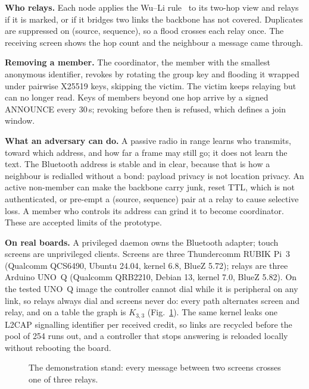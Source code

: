 \documentclass[10pt,twocolumn,letterpaper]{article}
\newcommand{\sub}[1]{\smallskip\noindent\textsf{\textbf{#1}}\enspace}
\begin{document}
\sub{Who relays.} Each node applies the Wu--Li rule~\cite{wuli1999} to
its two-hop view and relays if it is marked, or if it bridges two links
the backbone has not covered. Duplicates are suppressed on (source,
sequence), so a flood crosses each relay once. The receiving screen
shows the hop count and the neighbour a message came through.

\sub{Removing a member.} The coordinator, the member with the smallest
anonymous identifier, revokes by rotating the group key and flooding it
wrapped under pairwise X25519 keys, skipping the victim. The victim keeps
relaying but can no longer read. Keys of members beyond one hop arrive
by a signed ANNOUNCE every 30\,s; revoking before then is refused, which
defines a join window.

\sub{What an adversary can do.} A passive radio in range learns who
transmits, toward which address, and how far a frame may still go; it
does not learn the text. The Bluetooth address is stable and in clear,
because that is how a neighbour is redialled without a bond: payload
privacy is not location privacy. An active non-member can make the
backbone carry junk, reset TTL, which is not authenticated, or pre-empt
a (source, sequence) pair at a relay to cause selective loss. A member
who controls its address can grind it to become coordinator. These are
accepted limits of the prototype.

\sub{On real boards.} A privileged daemon owns the Bluetooth adapter;
touch screens are unprivileged clients. Screens are three Thundercomm
RUBIK Pi~3 (Qualcomm QCS6490, Ubuntu 24.04, kernel 6.8, BlueZ 5.72);
relays are three Arduino UNO~Q (Qualcomm QRB2210, Debian 13, kernel 7.0,
BlueZ 5.82). On the tested UNO~Q image the controller cannot dial while
it is peripheral on any link, so relays always dial and screens never do:
every path alternates screen and relay, and on a table the graph is
$K_{3,3}$ (Fig.~\ref{fig:stand}). The same kernel leaks one L2CAP
signalling identifier per received credit, so links are recycled before
the pool of 254 runs out, and a controller that stops answering is
reloaded locally without rebooting the board.

\begin{figure}[t]
\centering
{}
\caption{The demonstration stand: every message between two screens
crosses one of three relays.}
\label{fig:stand}
\end{figure}
\end{document}
